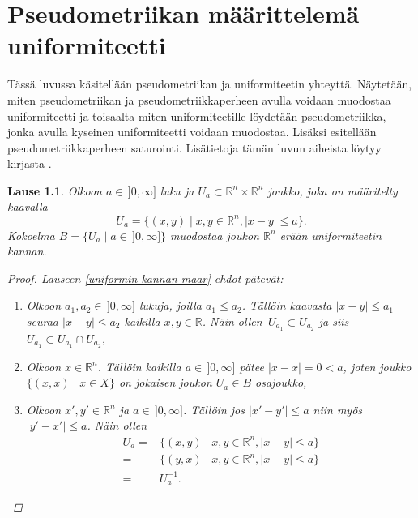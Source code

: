 \documentclass[12pt,a4paper,leqno]{report}
\newcommand{\R}{\mathbb{R}}
\theoremstyle{plain}
\newtheorem{lause}[equation]{Lause}
\theoremstyle{definition}
\theoremstyle{remark}
\begin{document}
\chapter{Pseudometriikan määrittelemä uniformiteetti}\label{luku_pseudo_uniformi}
Tässä luvussa käsitellään pseudometriikan ja uniformiteetin yhteyttä. 
Näytetään, miten pseudometriikan ja pseudometriikkaperheen avulla voidaan muodostaa uniformiteetti 
ja toisaalta miten uniformiteetille löydetään pseudometriikka, 
jonka avulla kyseinen uniformiteetti voidaan muodostaa. 
Lisäksi esitellään pseudometriikkaperheen saturointi. 
Lisätietoja tämän luvun aiheista löytyy kirjasta \cite[luku~IX]{Eom2}.
\begin{lause}
Olkoon $a\in\,]0,\infty]$ luku ja $U_a\subset \R^n\times\R^n$ joukko, 
joka on määritelty kaavalla
$$U_a=\{ (x,y)\mid x,y\in\R^n,|x-y|\leq a\}.$$
Kokoelma $B=\{U_a\mid a\in\,]0,\infty]\}$ muodostaa 
joukon $\R^n$ erään uniformiteetin kannan.
\begin{proof}
Lauseen \ref{uniformin kannan maar} ehdot pätevät:
\begin{enumerate} [label=(B\arabic*)]
\item %
Olkoon $a_1,a_2\in\,]0,\infty]$ lukuja, joilla $a_1\leq a_2$. Tällöin kaavasta $|x-y|\leq a_1$ seuraa $|x-y|\leq a_2$ kaikilla $x,y\in\R$. Näin ollen $\, U_{a_1}\subset U_{a_2}$ ja siis $U_{a_1}\subset U_{a_1}\cap U_{a_2}$,
\item%
Olkoon $x\in\R^n$. Tällöin kaikilla $a\in\,]0,\infty]$ pätee $|x-x|=0< a$, joten joukko $\{(x,x)\mid x\in X\}$ on jokaisen joukon $U_a\in B$ osajoukko,
\item%
Olkoon $x',y'\in\R^n$ ja $a\in\,]0,\infty]$. Tällöin jos $|x'-y'|\leq a$ niin myös $|y'-x'|\leq a$. Näin ollen 
\begin{align*}
U_a=&\{ (x,y)\mid x,y\in\R^n,|x-y|\leq a\}\\
=&\{ (y,x)\mid x,y\in\R^n,|x-y|\leq a\}\\
=&U_a^{-1}.

\end{align*}
\end{enumerate}
\end{proof}
\end{lause}
\end{document}
